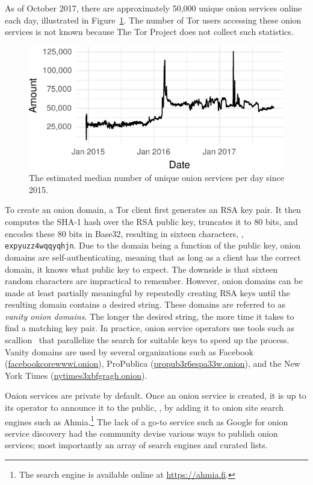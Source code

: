 As of October 2017, there are approximately 50,000 unique onion services online
each day, illustrated in Figure~\ref{fig:os-growth}.  The number of Tor users
accessing these onion services is not known because The Tor Project does not
collect such statistics.

\begin{figure}[ht]
\includegraphics[width=\linewidth]{figures/os-growth.pdf}
\caption{The estimated median number of unique onion services per day since
2015.}
\label{fig:os-growth}
\end{figure}

To create an onion domain, a Tor client first generates an RSA key pair.  It
then computes the SHA-1 hash over the RSA public key, truncates it to 80 bits,
and encodes these 80 bits in Base32, resulting in sixteen characters, \eg,
\texttt{expyuzz4wqqyqhjn}.  Due to the domain being a function of the public
key, onion domains are self-authenticating, meaning that as long as a client has
the correct domain, it knows what public key to expect.  The downside is that
sixteen random characters are impractical to remember.  However, onion domains
can be made at least partially meaningful by repeatedly creating RSA keys until
the resulting domain contains a desired string.  These domains are referred to
as \emph{vanity onion domains}.  The longer the desired string, the more time it
takes to find a matching key pair.  In practice, onion service operators use
tools such as scallion~\cite{scallion} that parallelize the search for suitable
keys to speed up the process.  Vanity domains are used by several organizations
such as Facebook (\url{facebookcorewwwi.onion}), ProPublica
(\url{propub3r6espa33w.onion}), and the New York Times
(\url{nytimes3xbfgragh.onion}).

Onion services are private by default.  Once an onion service is created, it is
up to its operator to announce it to the public, \eg, by adding it to onion site
search engines such as Ahmia.\footnote{The search engine is available online at
\url{https://ahmia.fi}.}  The lack of a go-to service such as Google for onion
service discovery had the community devise various ways to publish onion
services; most importantly an array of search engines and curated lists.
